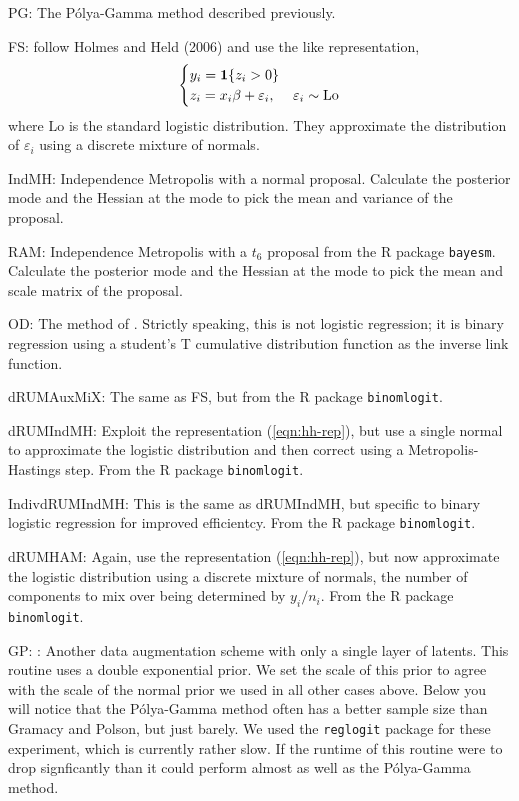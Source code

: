 \documentclass{article}
\newcommand{\one}{\bold{1}}
\newcommand{\ep}{\varepsilon}
\newcommand{\Polya}{P\'{o}lya}
\begin{document}
\begin{outline}

\1 PG: The \Polya-Gamma method described previously.

\1 FS: \cite{fruhwirth-schnatter-fruhwirth-2010} follow Holmes and Held (2006)
and use the \cite{albert-chib-1993} like representation,
\begin{equation}
\label{eqn:hh-rep}
\begin{cases}
y_i = \one \{ z_i > 0 \} \\
z_i = x_i \beta + \ep_i, & \ep_i \sim \text{Lo}
\end{cases}
\end{equation}
where $\text{Lo}$ is the standard logistic distribution.  They approximate the
distribution of $\ep_i$ using a discrete mixture of normals.

\1 IndMH: Independence Metropolis with a normal proposal.  Calculate the
posterior mode and the Hessian at the mode to pick the mean and variance of the
proposal.

\1 RAM: Independence Metropolis with a $t_6$ proposal from the R package
\texttt{bayesm}.  Calculate the posterior mode and the Hessian at the mode to
pick the mean and scale matrix of the proposal.

\1 OD: The method of \cite{obrien-dunson-2004}.  Strictly speaking, this is not
logistic regression; it is binary regression using a student's T cumulative
distribution function as the inverse link function.

\1 dRUMAuxMiX: The same as FS, but from the R package \texttt{binomlogit}.

\1 dRUMIndMH: Exploit the representation (\ref{eqn:hh-rep}), but use a single
normal to approximate the logistic distribution and then correct using a
Metropolis-Hastings step.  From the R package \texttt{binomlogit}.

\1 IndivdRUMIndMH: This is the same as dRUMIndMH, but specific to binary
logistic regression for improved efficientcy.  From the R package
\texttt{binomlogit}.

\1 dRUMHAM: Again, use the representation (\ref{eqn:hh-rep}), but now
approximate the logistic distribution using a discrete mixture of normals, the
number of components to mix over being determined by $y_i / n_i$.  From the R
package \texttt{binomlogit}.

\1 GP: \cite{gramacy-polson-2012}: Another data augmentation scheme with only a
single layer of latents.  This routine uses a double exponential prior.  We set
the scale of this prior to agree with the scale of the normal prior we used in
all other cases above.  Below you will notice that the \Polya-Gamma method often
has a better sample size than Gramacy and Polson, but just barely.  We used the
\texttt{reglogit} package for these experiment, which is currently rather
slow.  If the runtime of this routine were to drop signficantly than it could
perform almost as well as the \Polya-Gamma method.

\end{outline}
\end{document}
